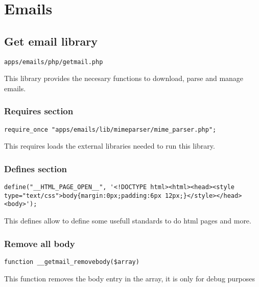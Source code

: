 \documentclass[a4paper]{article}
\begin{document}
\hypertarget{toc28}{}
\section{Emails}

\hypertarget{toc29}{}
\subsection{Get email library}

\begin{lstlisting}
apps/emails/php/getmail.php
\end{lstlisting}

This library provides the necesary functions to download, parse and manage emails.

\hypertarget{toc30}{}
\subsubsection{Requires section}

\begin{lstlisting}
require_once "apps/emails/lib/mimeparser/mime_parser.php";
\end{lstlisting}

This requires loads the external libraries needed to run this library.

\hypertarget{toc31}{}
\subsubsection{Defines section}

\begin{lstlisting}
define("__HTML_PAGE_OPEN__", '<!DOCTYPE html><html><head><style type="text/css">body{margin:0px;padding:6px 12px;}</style></head><body>');
\end{lstlisting}

This defines allow to define some usefull standards to do html pages and more.

\hypertarget{toc32}{}
\subsubsection{Remove all body}

\begin{lstlisting}
function __getmail_removebody($array)
\end{lstlisting}

This function removes the body entry in the array, it is only for debug purposes
\end{document}

